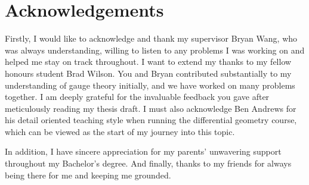 
\chapter*{Acknowledgements}\label{acknowledgements}

Firstly, I would like to acknowledge and thank my supervisor Bryan Wang, who was 
always understanding, willing to listen to any problems I was working on and helped me
stay on track throughout. I want to extend my thanks to my fellow
honours student Brad Wilson. You and Bryan contributed substantially to my 
understanding of gauge theory initially, and we have worked on many problems 
together. I am deeply grateful for the invaluable feedback you gave after
meticulously reading my thesis draft. I must also acknowledge Ben Andrews for his
detail oriented teaching style when running the differential geometry course, 
which can be viewed as the start of my journey into this topic. 

In addition, I have sincere appreciation for my 
parents' unwavering support throughout my Bachelor's 
degree. And finally, thanks to my friends for always being there for me and
keeping me grounded. 
